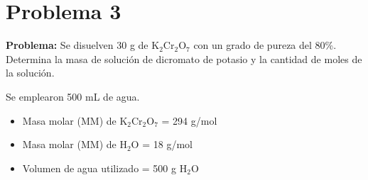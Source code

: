 \documentclass{article}
\begin{document}
\newpage
\section*{Problema 3}
\textbf{Problema:}
Se disuelven 30 g de K$_2$Cr$_2$O$_7$ con un grado de pureza del 80\%. Determina la masa de solución de dicromato de potasio y la cantidad de moles de la solución.

Se emplearon 500 mL de agua.

\begin{itemize} \item Masa molar (MM) de K$_2$Cr$_2$O$_7$ = 294 g/mol \item Masa molar (MM) de H$_2$O = 18 g/mol \item Volumen de agua utilizado = 500 g H$_2$O \end{itemize}
\end{document}
